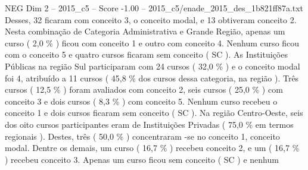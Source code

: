 \begin{textsample}{NEG Dim 2 – 2015\_c5 – Score -1.00 – 2015\_c5/enade\_2015\_des\_1b821ff87a.txt}
Desses, 32 ficaram com conceito 3, o conceito modal, e 13 obtiveram conceito 2.
Nesta combinação de Categoria Administrativa e Grande Região, apenas um curso ( 2,0 \% ) ficou com conceito 1 e outro com conceito 4.
Nenhum curso ficou com o conceito 5 e quatro cursos ficaram sem conceito ( SC ).
As Instituições Públicas na região Sul participaram com 24 cursos ( 32,0 \% ) e o conceito modal foi 4, atribuído a 11 cursos ( 45,8 \% dos cursos dessa categoria, na região ).
Três cursos ( 12,5 \% ) foram avaliados com conceito 2, seis cursos ( 25,0 \% ) com conceito 3 e dois cursos ( 8,3 \% ) com conceito 5.
Nenhum curso recebeu o conceito 1 e dois cursos ficaram sem conceito ( SC ).
Na região Centro-Oeste, seis dos oito cursos participantes eram de Instituições Privadas ( 75,0 \% em termos regionais ).
Destes, três ( 50,0 \% ) concentraram -se no conceito 1, conceito modal.
Dentre os demais, um curso ( 16,7 \% ) recebeu conceito 2, e um ( 16,7 \% ) recebeu conceito 3.
Apenas um curso ficou sem conceito ( SC ) e nenhum

\end{textsample}
